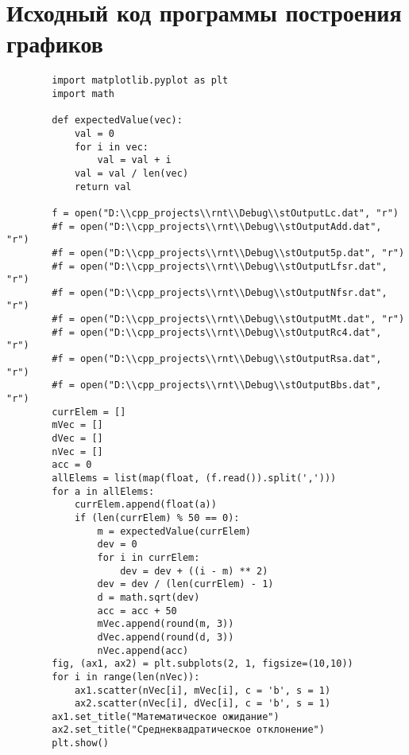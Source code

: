 \documentclass[bachelor, och, coursework]{shiza}
\begin{document}
	\section{Исходный код программы построения графиков}
	
	\begin{verbatim}
		import matplotlib.pyplot as plt
		import math
		
		def expectedValue(vec):
			val = 0
			for i in vec:
				val = val + i
			val = val / len(vec)
			return val
		
		f = open("D:\\cpp_projects\\rnt\\Debug\\stOutputLc.dat", "r")
		#f = open("D:\\cpp_projects\\rnt\\Debug\\stOutputAdd.dat", "r")
		#f = open("D:\\cpp_projects\\rnt\\Debug\\stOutput5p.dat", "r")
		#f = open("D:\\cpp_projects\\rnt\\Debug\\stOutputLfsr.dat", "r")
		#f = open("D:\\cpp_projects\\rnt\\Debug\\stOutputNfsr.dat", "r")
		#f = open("D:\\cpp_projects\\rnt\\Debug\\stOutputMt.dat", "r")
		#f = open("D:\\cpp_projects\\rnt\\Debug\\stOutputRc4.dat", "r")
		#f = open("D:\\cpp_projects\\rnt\\Debug\\stOutputRsa.dat", "r")
		#f = open("D:\\cpp_projects\\rnt\\Debug\\stOutputBbs.dat", "r")
		currElem = []
		mVec = []
		dVec = []
		nVec = []
		acc = 0
		allElems = list(map(float, (f.read()).split(',')))
		for a in allElems:
			currElem.append(float(a))
			if (len(currElem) % 50 == 0):
				m = expectedValue(currElem)
				dev = 0
				for i in currElem:
					dev = dev + ((i - m) ** 2)
				dev = dev / (len(currElem) - 1)
				d = math.sqrt(dev)
				acc = acc + 50
				mVec.append(round(m, 3))
				dVec.append(round(d, 3))
				nVec.append(acc)
		fig, (ax1, ax2) = plt.subplots(2, 1, figsize=(10,10))
		for i in range(len(nVec)):
			ax1.scatter(nVec[i], mVec[i], c = 'b', s = 1)
			ax2.scatter(nVec[i], dVec[i], c = 'b', s = 1)
		ax1.set_title("Математическое ожидание")
		ax2.set_title("Среднеквадратическое отклонение")
		plt.show()
	\end{verbatim}

	
\end{document}
